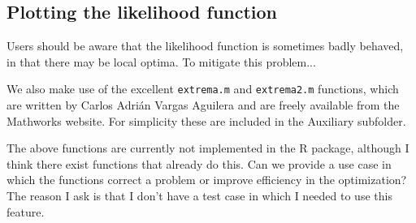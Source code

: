 \documentclass[article]{jss}
\begin{document}
%
% 
%

\subsection{Plotting the likelihood function} \label{sec:extensions}



Users should be aware that the likelihood function is sometimes badly behaved, in that there may be local optima. To mitigate this problem...

We also make use of the excellent \verb|extrema.m| and \verb|extrema2.m| functions, which are written by Carlos Adrián Vargas Aguilera and are freely available from the Mathworks website. For simplicity these are included in the Auxiliary subfolder.

\begin{leftbar}
The above functions are currently not implemented in the R package, although I think there exist functions that already do this. 
Can we provide a use case in which the functions correct a problem or improve efficiency in the optimization?
The reason I ask is that I don't have a test case in which I needed to use this feature. 
\end{leftbar}
\end{document}
